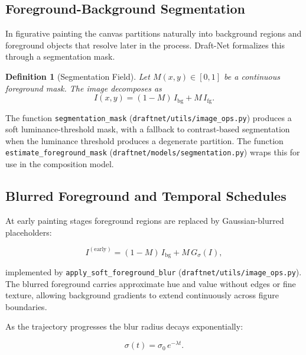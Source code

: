 \documentclass[12pt,a4paper]{article}
\theoremstyle{draftthm}
\newtheorem{definition}{Definition}[section]
\newcommand{\code}[1]{\texttt{\small #1}}
\begin{document}
\subsection{Foreground-Background Segmentation}

In figurative painting the canvas partitions naturally into background regions and foreground objects that resolve later in the process. Draft-Net formalizes this through a segmentation mask.

\begin{definition}[Segmentation Field]
  Let $M(x,y) \in [0,1]$ be a continuous foreground mask. The image decomposes as
  \begin{equation}
    I(x,y) = (1-M)\, I_{\mathrm{bg}} + M\, I_{\mathrm{fg}}.
    \label{eq:image-decomp}
  \end{equation}
\end{definition}

The function \code{segmentation\_mask} (\code{draftnet/utils/image\_ops.py}) produces a soft luminance-threshold mask, with a fallback to contrast-based segmentation when the luminance threshold produces a degenerate partition. The function \code{estimate\_foreground\_mask} (\code{draftnet/models/segmentation.py}) wraps this for use in the composition model.

\subsection{Blurred Foreground and Temporal Schedules}

At early painting stages foreground regions are replaced by Gaussian-blurred placeholders:

\begin{equation}
  I^{(\mathrm{early})} = (1-M)\, I_{\mathrm{bg}} + M\, G_{\sigma}(I),
  \label{eq:early-image}
\end{equation}

implemented by \code{apply\_soft\_foreground\_blur} (\code{draftnet/utils/image\_ops.py}). The blurred foreground carries approximate hue and value without edges or fine texture, allowing background gradients to extend continuously across figure boundaries.

As the trajectory progresses the blur radius decays exponentially:

\begin{equation}
  \sigma(t) = \sigma_0\, e^{-\lambda t}.
  \label{eq:blur-schedule}
\end{equation}
\end{document}
